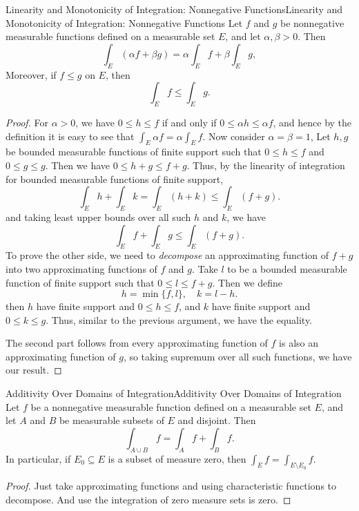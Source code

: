 \documentclass[../main.tex]{subfiles}
\begin{document}
\begin{theorem}{Linearity and Monotonicity of Integration: Nonnegative Functions}{Linearity and Monotonicity of Integration: Nonnegative Functions}
	Let $f$ and $g$ be nonnegative measurable functions defined on a measurable set $E$, and let $\alpha, \beta > 0$. Then
	\begin{equation}
		\int_E (\alpha f + \beta g) = \alpha \int_E f + \beta \int_E g,
	\end{equation}
	Moreover, if $f \leq g$ on $E$, then
	\begin{equation}
		\int_E f \leq \int_E g.
	\end{equation}
\end{theorem}
\begin{proof}
	For $\alpha > 0$, we have $0 \leq h \leq f$ if and only if $0 \leq \alpha h \leq \alpha f$, and hence by the definition it is easy to see that $\int_E \alpha f = \alpha \int_E f$. Now consider $\alpha = \beta = 1$, Let $h,g$ be bounded measurable functions of finite support such that $0 \leq h \leq f$ and $0 \leq g \leq g$. Then we have $0 \leq h + g \leq f + g$. Thus, by the linearity of integration for bounded measurable functions of finite support, 
	\begin{equation*}
		\int_E h + \int_E k = \int_E (h + k) \leq \int_E (f + g).
	\end{equation*}
	and taking least upper bounds over all such $h$ and $k$, we have
	\begin{equation*}
		\int_E f + \int_E g \leq \int_E (f + g).
	\end{equation*}
	To prove the other side, we need to \emph{decompose} an approximating function of $f + g$ into two approximating functions of $f$ and $g$. Take $l$ to be a bounded measurable function of finite support such that $0 \leq l \leq f + g$. Then we define
	\begin{equation*}
		h = \min\{f, l\}, \quad k = l - h.
	\end{equation*}
	then $h$ have finite support and $0 \leq h \leq f$, and $k$ have finite support and $0 \leq k \leq g$. Thus, similar to the previous argument, we have the equality.

	The second part follows from every approximating function of $f$ is also an approximating function of $g$, so taking supremum over all such functions, we have our result.
\end{proof}

\begin{theorem}{Additivity Over Domains of Integration}{Additivity Over Domains of Integration}
	Let $f$ be a nonnegative measurable function defined on a measurable set $E$, and let $A$ and $B$ be measurable subsets of $E$ and disjoint. Then
	\begin{equation}
		\int_{A \cup B} f = \int_A f + \int_B f.
	\end{equation}
	In particular, if $E_0 \subseteq E$ is a subset of measure zero, then $\int_E f = \int_{E \setminus E_0} f$.
\end{theorem}
\begin{proof}
	Just take approximating functions and using characteristic functions to decompose. And use the integration of zero measure sets is zero.
\end{proof}
\end{document}
